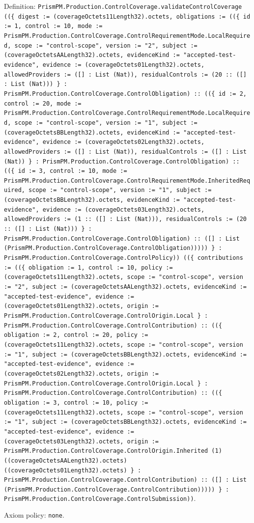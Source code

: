 \documentclass[11pt]{article}
\begin{document}
\noindent Definition: \texttt{PrismPM.Production.ControlCoverage.validateControlCoverage ((\{ digest := (coverageOctets11Length32).octets, obligations := ((\{ id := 1, control := 10, mode := PrismPM.Production.ControlCoverage.ControlRequirementMode.LocalRequired, scope := "control-scope", version := "2", subject := (coverageOctetsAALength32).octets, evidenceKind := "accepted-test-evidence", evidence := (coverageOctets01Length32).octets, allowedProviders := ([] : List (Nat)), residualControls := (20 :: ([] : List (Nat))) \} : PrismPM.Production.ControlCoverage.ControlObligation) :: ((\{ id := 2, control := 20, mode := PrismPM.Production.ControlCoverage.ControlRequirementMode.LocalRequired, scope := "control-scope", version := "1", subject := (coverageOctetsBBLength32).octets, evidenceKind := "accepted-test-evidence", evidence := (coverageOctets02Length32).octets, allowedProviders := ([] : List (Nat)), residualControls := ([] : List (Nat)) \} : PrismPM.Production.ControlCoverage.ControlObligation) :: ((\{ id := 3, control := 10, mode := PrismPM.Production.ControlCoverage.ControlRequirementMode.InheritedRequired, scope := "control-scope", version := "1", subject := (coverageOctetsBBLength32).octets, evidenceKind := "accepted-test-evidence", evidence := (coverageOctets03Length32).octets, allowedProviders := (1 :: ([] : List (Nat))), residualControls := (20 :: ([] : List (Nat))) \} : PrismPM.Production.ControlCoverage.ControlObligation) :: ([] : List (PrismPM.Production.ControlCoverage.ControlObligation))))) \} : PrismPM.Production.ControlCoverage.ControlPolicy)) ((\{ contributions := ((\{ obligation := 1, control := 10, policy := (coverageOctets11Length32).octets, scope := "control-scope", version := "2", subject := (coverageOctetsAALength32).octets, evidenceKind := "accepted-test-evidence", evidence := (coverageOctets01Length32).octets, origin := PrismPM.Production.ControlCoverage.ControlOrigin.Local \} : PrismPM.Production.ControlCoverage.ControlContribution) :: ((\{ obligation := 2, control := 20, policy := (coverageOctets11Length32).octets, scope := "control-scope", version := "1", subject := (coverageOctetsBBLength32).octets, evidenceKind := "accepted-test-evidence", evidence := (coverageOctets02Length32).octets, origin := PrismPM.Production.ControlCoverage.ControlOrigin.Local \} : PrismPM.Production.ControlCoverage.ControlContribution) :: ((\{ obligation := 3, control := 10, policy := (coverageOctets11Length32).octets, scope := "control-scope", version := "1", subject := (coverageOctetsBBLength32).octets, evidenceKind := "accepted-test-evidence", evidence := (coverageOctets03Length32).octets, origin := PrismPM.Production.ControlCoverage.ControlOrigin.Inherited (1) ((coverageOctetsAALength32).octets) ((coverageOctets01Length32).octets) \} : PrismPM.Production.ControlCoverage.ControlContribution) :: ([] : List (PrismPM.Production.ControlCoverage.ControlContribution))))) \} : PrismPM.Production.ControlCoverage.ControlSubmission))}.\par
\noindent Axiom policy: \texttt{none}.\par
\end{document}
